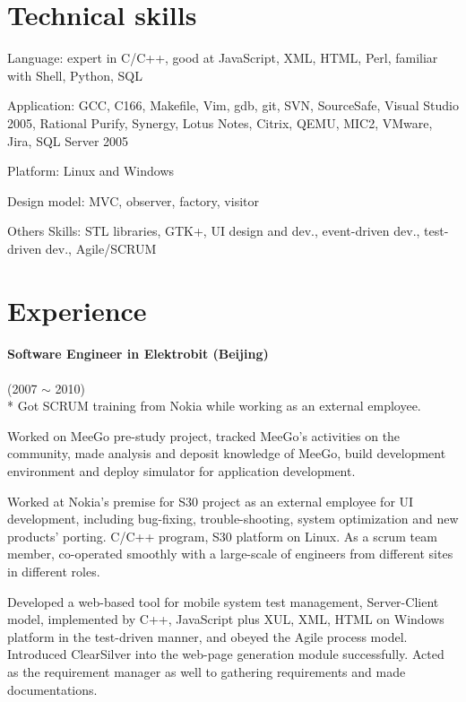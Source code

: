 \documentclass[a4paper,11pt]{article}
\begin{document}
\section*{Technical skills}
\begin{description*}
    \setlength\itemindent{0cm}
    \setlength\itemsep{0.4em}
  \item [Language:] expert in C/C++, good at JavaScript, XML, HTML, Perl, familiar with Shell, Python, SQL
  \item [Application:] GCC, C166, Makefile, Vim, gdb, git, SVN, SourceSafe, Visual Studio 2005, Rational Purify, Synergy, Lotus Notes, Citrix, QEMU, MIC2, VMware, Jira, SQL Server 2005
  \item [Platform:] Linux and Windows
  \item [Design model:] MVC, observer, factory, visitor
  \item [Others Skills:] STL libraries, GTK+, UI design and dev., event-driven dev., test-driven dev., Agile/SCRUM
\end{description*}

\section*{Experience}

\paragraph{Software Engineer in Elektrobit (Beijing)} (2007 $\sim$ 2010) \\*
Got SCRUM training from Nokia while working as an external employee.
\begin{itemize*}
    \setlength\itemsep{0.4em}
  \item Worked on MeeGo pre-study project, tracked MeeGo's activities on the community, made analysis and deposit knowledge of MeeGo, build development environment and deploy simulator for application development.
  \item Worked at Nokia's premise for S30 project as an external employee for UI development, including bug-fixing, trouble-shooting, system optimization and new products' porting. C/C++ program, S30 platform on Linux. As a scrum team member, co-operated smoothly with a large-scale of engineers from different sites in different roles.
  \item Developed a web-based tool for mobile system test management, Server-Client model, implemented by C++, JavaScript plus XUL, XML, HTML on Windows platform in the test-driven manner, and obeyed the Agile process model. Introduced ClearSilver into the web-page generation module successfully. Acted as the requirement manager as well to gathering requirements and made documentations.
\end{itemize*}
\end{document}
